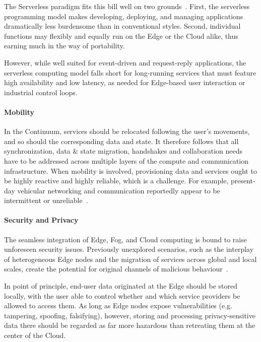 The Serverless paradigm fits this bill well on two grounds~\cite{yi2017lavea}. First, the serverless programming model makes  developing, deploying, and managing applications dramatically less burdensome than in conventional styles.
Second, individual functions may flexibly and equally run on the Edge or the Cloud alike, thus earning much in the way of portability.

However, while well suited for event-driven and request-reply applications, the serverless computing model falls short for long-running services that must feature high availability and low latency, as needed for Edge-based user interaction or industrial control loops.

\paragraph{Mobility}
In the Continuum, services should be relocated following the user's movements, and so should the corresponding data and state. 
It therefore follows that all synchronization, data \& state migration, handshakes and collaboration needs have to be addressed across multiple layers of the compute and communication infrastructure.
When mobility is involved, provisioning data and services ought to be highly reactive and highly reliable, which is a challenge. 
For example, present-day vehicular networking and communication reportedly appear to be intermittent or unreliable~\cite{he2014developing}.

\paragraph{Security and Privacy}

The seamless integration of Edge, Fog, and Cloud computing is bound to raise unforeseen security issues. Previously unexplored scenarios, such as the interplay of heterogeneous Edge nodes and the migration of services across global and local scales, create the potential for original channels of malicious behaviour~\cite{yu2017survey}.

In point of principle, end-user data originated at the Edge should be stored locally, with the user able to control whether and which service providers be allowed to access them. 
As long as Edge nodes expose vulnerabilities (e.g. tampering, spoofing, falsifying), however, storing and processing privacy-sensitive data there should be regarded as far more hazardous than retreating them at the center of the Cloud.

